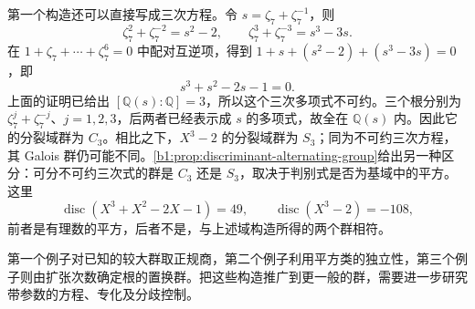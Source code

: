 第一个构造还可以直接写成三次方程。令 \(s=\zeta_7+\zeta_7^{-1}\)，则
\[
	\zeta_7^2+\zeta_7^{-2}=s^2-2,\qquad \zeta_7^3+\zeta_7^{-3}=s^3-3s.
\]
在 \(1+\zeta_7+\cdots+\zeta_7^6=0\) 中配对互逆项，得到 \(1+s+(s^2-2)+(s^3-3s)=0\)，即
\[
	s^3+s^2-2s-1=0.
\]
上面的证明已给出 \([\mathbb Q(s):\mathbb Q]=3\)，所以这个三次多项式不可约。三个根分别为 \(\zeta_7^j+\zeta_7^{-j}\)、\(j=1,2,3\)，后两者已经表示成 \(s\) 的多项式，故全在 \(\mathbb Q(s)\) 内。因此它的分裂域群为 \(C_3\)。相比之下，\(X^3-2\) 的分裂域群为 \(S_3\)；同为不可约三次方程，其 Galois 群仍可能不同。\cref{b1:prop:discriminant-alternating-group}给出另一种区分：可分不可约三次式的群是 \(C_3\) 还是 \(S_3\)，取决于判别式是否为基域中的平方。这里
\[
	\operatorname{disc}(X^3+X^2-2X-1)=49,\qquad \operatorname{disc}(X^3-2)=-108,
\]
前者是有理数的平方，后者不是，与上述域构造所得的两个群相符。

\ProseParagraphBreak
第一个例子对已知的较大群取正规商，第二个例子利用平方类的独立性，第三个例子则由扩张次数确定根的置换群。把这些构造推广到更一般的群，需要进一步研究带参数的方程、专化及分歧控制。
